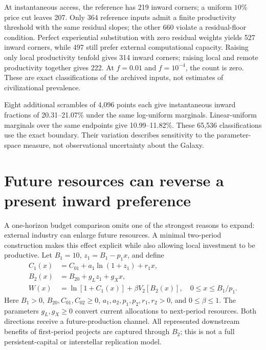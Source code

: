 \documentclass[11pt,a4paper]{article}
\theoremstyle{definition}\newtheorem{definition}{Definition}
\newcommand{\DesignLogMin}{20.31}
\newcommand{\DesignLogMax}{21.07}
\newcommand{\DesignLinearMin}{10.99}
\newcommand{\DesignLinearMax}{11.82}
\begin{document}
At instantaneous access, the reference has 219 inward corners; a
uniform $10\%$ price cut leaves 207. Only 364 reference inputs admit
a finite productivity threshold with the same residual slopes; the other
660 violate a residual-floor condition. Perfect experiential substitution
with zero residual weights yields 527 inward corners, while 497 still
prefer external computational capacity. Raising only local productivity
tenfold gives 314 inward corners; raising local and remote productivity
together gives 222. At $f=0.01$ and $f=10^{-4}$, the count is zero.
These are exact classifications of the archived inputs, not estimates of
civilizational prevalence.

Eight additional scrambles of 4,096 points each give instantaneous
inward fractions of \DesignLogMin--\DesignLogMax\% under the same
log-uniform marginals. Linear-uniform marginals over the same endpoints
give \DesignLinearMin--\DesignLinearMax\%. These 65,536 classifications
use the exact boundary. Their variation describes sensitivity to the
parameter-space measure, not observational uncertainty about the Galaxy.

\section{Future resources can reverse a present inward preference}
\label{sec:dynamic}

A one-horizon budget comparison omits one of the strongest reasons to expand: external industry can enlarge future resources. A minimal two-period construction makes this effect explicit while also allowing local investment to be productive. Let $B_1=10$, $z_1=B_1-p_1x$, and define
\begin{align}
 C_1(x)&=C_{01}+a_1\ln(1+z_1)+r_1x,\nonumber\\
 B_2(x)&=B_{20}+g_Lz_1+g_Xx,\label{eq:futurebudget}\\
 W(x)&=\ln[1+C_1(x)]+\beta V_2[B_2(x)],\quad 0\leq x\leq B_1/p_1.
 \label{eq:dynamic}
\end{align}
Here $B_1>0$, $B_{20},C_{01},C_{02}\geq0$, $a_1,a_2,p_1,p_2,r_1,r_2>0$, and $0\leq\beta\leq1$. The parameters $g_L,g_X\geq0$ convert current allocations to next-period resources. Both directions receive a future-production channel. All represented downstream benefits of first-period projects are captured through $B_2$; this is not a full persistent-capital or interstellar replication model.
\end{document}
